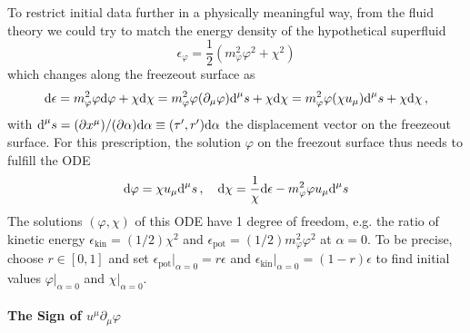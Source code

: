 To restrict initial data further in a physically meaningful way, from the fluid theory we could try to match the energy density of the hypothetical superfluid
\begin{equation}
    \epsilon_\varphi=\frac{1}{2}(m_\varphi^2\varphi^2+\chi^2)
\end{equation}
which changes along the freezeout surface as
    \begin{equation}
        \text{d}\epsilon=m_\varphi^2\varphi\text{d}\varphi+\chi\text{d}\chi=m_\varphi^2\varphi(\partial_\mu\varphi)\text{d}^\mu s+\chi\text{d}\chi=m_\varphi^2\varphi(\chi u_\mu)\text{d}^\mu s+\chi\text{d}\chi\,,
    \end{equation}
with ${\text{d}^\mu s=(\partial x^\mu)/(\partial\alpha)\text{d}\alpha\equiv(\tau^\prime,r^\prime)\text{d}\alpha}$ the displacement vector on the freezeout surface. For this prescription, the solution $\varphi$ on the freezout surface thus needs to fulfill the ODE
\begin{equation}
    \text{d}\varphi=\chi u_\mu\text{d}^\mu s\,,\quad
    \text{d}\chi=\frac{1}{\chi}\text{d}\epsilon-m_\varphi^2\varphi u_\mu\text{d}^\mu s
    \label{eq:InitialConditions_ODE}
\end{equation}
The solutions $(\varphi,\chi)$ of this ODE have 1 degree of freedom, e.g. the ratio of kinetic energy ${\epsilon_{\text{kin}}=(1/2)\chi^2}$ and ${\epsilon_{\text{pot}}=(1/2)m_\varphi^2\varphi^2}$ at $\alpha=0$. To be precise, choose ${r\in[0,1]}$ and set ${\epsilon_{\text{pot}}\big\vert_{\alpha=0}=r\epsilon}$ and ${\epsilon_{\text{kin}}\big\vert_{\alpha=0}=(1-r)\epsilon}$ to find initial values $\varphi\vert_{\alpha=0}$ and $\chi\vert_{\alpha=0}$.

\paragraph{The Sign of $u^\mu\partial_\mu\varphi$}

